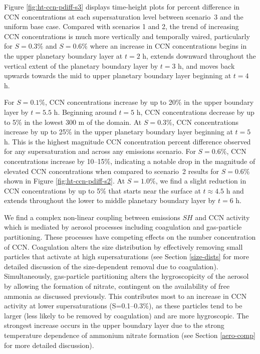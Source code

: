Figure \ref{fig:ht-ccn-pdiff-s3} displays time-height plots for percent difference in CCN concentrations at each supersaturation level between scenario~3 and the uniform base case. 
Compared with scenarios 1 and 2, the trend of increasing CCN concentrations is much more vertically and temporally vaired, particularly for $S=0.3\%$ and $S=0.6\%$ where an increase in CCN concentrations begins in the upper planetary boundary layer at $t=2$ h, extends downward throughout the vertical extent of the planetary boundary layer by $t=3$ h, and moves back upwards towards the mid to upper planetary boundary layer beginning at $t=4$ h. 

For $S=0.1\%$, CCN concentrations increase by up to 20\% in the upper boundary layer by $t=5.5$ h. Beginning around $t=5$ h, CCN concentrations decrease by up to 5\% in the lowest 300 m of the domain. At $S=0.3\%$, CCN concentrations increase by up to 25\% in the upper planetary boundary layer beginning at $t=5$ h. This is the highest magnitude CCN concentration percent difference observed for any supersaturation and across any emissions scenario. For $S=0.6\%$, CCN concentrations increase by 10--15\%, indicating a notable drop in the magnitude of elevated CCN concentrations when compared to scenario~2 results for $S=0.6\%$ shown in Figure \ref{fig:ht-ccn-pdiff-s2}. At $S=1.0\%$, we find a slight reduction in CCN concentrations by up to 5\% that starts near the surface at $t\approx4.5$ h and extends throughout the lower to middle planetary boundary layer by $t=6$ h. 

We find a complex non-linear coupling between emissions $SH$ and CCN activity which is mediated by aerosol processes including coagulation and gas-particle partitioning. These processes have competing effects on the number concentration of CCN. Coagulation alters the size distribution by effectively removing small particles that activate at high supersaturations (see Section \ref{size-dists} for more detailed discussion of the size-dependent removal due to coagulation). Simultaneously, gas-particle partitioning alters the hygroscopicity of the aerosol by allowing the formation of nitrate, contingent on the availability of free ammonia as discussed previously. This contributes most to an increase in CCN activity at lower supersaturations (S=0.1--0.3\%), as these particles tend to be larger (less likely to be removed by coagulation) and are more hygroscopic. The strongest increase occurs in the upper boundary layer due to the strong temperature dependence of ammonium nitrate formation (see Section \ref{aero-comp} for more detailed discussion). 

